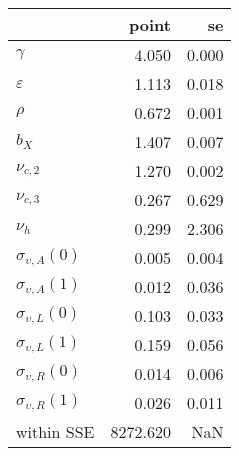 \begin{tabular}{lrr}
\toprule
{} &     point &     se \\
\midrule
$\gamma$                 &     4.050 &  0.000 \\
$\varepsilon$            &     1.113 &  0.018 \\
$\rho$                   &     0.672 &  0.001 \\
$b_X$                    &     1.407 &  0.007 \\
$\nu_{c,2}$              &     1.270 &  0.002 \\
$\nu_{c,3}$              &     0.267 &  0.629 \\
$\nu_{h}$                &     0.299 &  2.306 \\
$\sigma_{\upsilon,A}(0)$ &     0.005 &  0.004 \\
$\sigma_{\upsilon,A}(1)$ &     0.012 &  0.036 \\
$\sigma_{\upsilon,L}(0)$ &     0.103 &  0.033 \\
$\sigma_{\upsilon,L}(1)$ &     0.159 &  0.056 \\
$\sigma_{\upsilon,R}(0)$ &     0.014 &  0.006 \\
$\sigma_{\upsilon,R}(1)$ &     0.026 &  0.011 \\
within SSE               &  8272.620 &    NaN \\
\bottomrule
\end{tabular}
